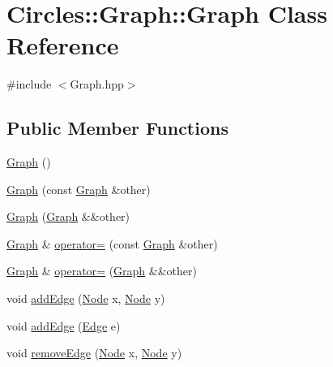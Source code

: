 \hypertarget{class_circles_1_1_graph_1_1_graph}{}\section{Circles\+:\+:Graph\+:\+:Graph Class Reference}
\label{class_circles_1_1_graph_1_1_graph}


{\ttfamily \#include $<$Graph.\+hpp$>$}

\subsection*{Public Member Functions}
\begin{DoxyCompactItemize}
\item 
\hyperlink{class_circles_1_1_graph_1_1_graph_a95707c8bcb3a2726554f46e53e3ed81c}{Graph} ()
\item 
\hyperlink{class_circles_1_1_graph_1_1_graph_af168837b8090fde8bec04ad7655f7198}{Graph} (const \hyperlink{class_circles_1_1_graph_1_1_graph}{Graph} \&other)
\item 
\hyperlink{class_circles_1_1_graph_1_1_graph_a4e3802ce745621050d878577cc0aa3f4}{Graph} (\hyperlink{class_circles_1_1_graph_1_1_graph}{Graph} \&\&other)
\item 
\hyperlink{class_circles_1_1_graph_1_1_graph}{Graph} \& \hyperlink{class_circles_1_1_graph_1_1_graph_ae60d35a5fa5840a19e26cfd907a04c46}{operator=} (const \hyperlink{class_circles_1_1_graph_1_1_graph}{Graph} \&other)
\item 
\hyperlink{class_circles_1_1_graph_1_1_graph}{Graph} \& \hyperlink{class_circles_1_1_graph_1_1_graph_a04ed0665e13e73f64217b1d4be604cbc}{operator=} (\hyperlink{class_circles_1_1_graph_1_1_graph}{Graph} \&\&other)
\item 
void \hyperlink{class_circles_1_1_graph_1_1_graph_a82638c54c3a88927f2cd25eef5b9d3ed}{add\+Edge} (\hyperlink{namespace_circles_1_1_graph_afab3817d1ee8e2074e82866c27a1058b}{Node} x, \hyperlink{namespace_circles_1_1_graph_afab3817d1ee8e2074e82866c27a1058b}{Node} y)
\item 
void \hyperlink{class_circles_1_1_graph_1_1_graph_a32639ee46ddea3aac13fd2d14c975b8e}{add\+Edge} (\hyperlink{class_circles_1_1_graph_1_1_edge}{Edge} e)
\item 
void \hyperlink{class_circles_1_1_graph_1_1_graph_a239c35f73a0d73d1281f38f447aeb66a}{remove\+Edge} (\hyperlink{namespace_circles_1_1_graph_afab3817d1ee8e2074e82866c27a1058b}{Node} x, \hyperlink{namespace_circles_1_1_graph_afab3817d1ee8e2074e82866c27a1058b}{Node} y)

\end{DoxyCompactItemize}
